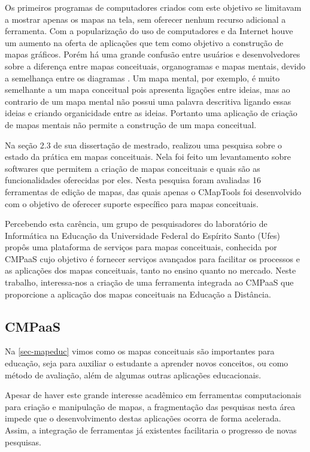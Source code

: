 \documentclass[
	12pt,				%
	openright,			%
	oneside,			%
	a4paper,			%
	english,			%
	french,				%
	spanish,			%
	brazil				%
	]{abntex2}
\begin{document}
Os primeiros programas de computadores criados com este objetivo se limitavam a mostrar apenas os mapas na tela, sem oferecer nenhum recurso adicional a ferramenta. Com a popularização do uso de computadores e da Internet houve um aumento na oferta de aplicações que tem como objetivo a construção de mapas gráficos. Porém há uma grande confusão entre usuários e desenvolvedores sobre a diferença entre mapas conceituais, organogramas e mapas mentais, devido a semelhança entre os diagramas \cite{Perin2014}. Um mapa mental, por exemplo, é muito semelhante a um mapa conceitual pois apresenta ligações entre ideias, mas ao contrario de um mapa mental não possui uma palavra descritiva ligando essas ideias e criando organicidade entre as ideias. Portanto uma aplicação de criação de mapas mentais não permite a construção de um mapa conceitual. 

Na seção 2.3 de sua dissertação de mestrado,  realizou uma pesquisa sobre o estado da prática em mapas conceituais. Nela foi feito um levantamento sobre softwares que permitem a criação de mapas conceituais e quais são as funcionalidades oferecidas por eles. Nesta pesquisa foram avaliadas 16 ferramentas de edição de mapas, das quais apenas o CMapTools foi desenvolvido com o objetivo de oferecer suporte específico para mapas conceituais.

Percebendo esta carência, um grupo de pesquisadores do laboratório de Informática na Educação da Universidade Federal do Espírito Santo (Ufes) propôs uma plataforma de serviços para mapas conceituais, conhecida por CMPaaS \cite{Perin2016} cujo objetivo é fornecer serviços avançados para facilitar os processos e as aplicações dos mapas conceituais, tanto no ensino quanto no mercado. Neste trabalho, interessa-nos a criação de uma ferramenta integrada ao CMPaaS que proporcione a aplicação dos mapas conceituais na Educação a Distância. 

\subsection{CMPaaS}

Na \autoref{sec-mapeduc} vimos como os mapas conceituais são importantes para educação, seja para auxiliar o estudante a aprender novos conceitos, ou como método de avaliação, além de algumas outras aplicações educacionais. 

Apesar de haver este grande interesse acadêmico em ferramentas computacionais para criação e manipulação de mapas, a fragmentação das pesquisas nesta área impede que o desenvolvimento destas aplicações ocorra de forma acelerada. Assim, a integração de ferramentas já existentes facilitaria o progresso de novas pesquisas.
\end{document}

